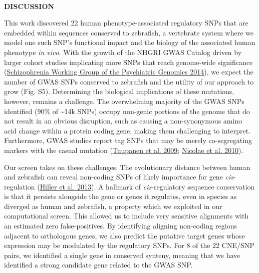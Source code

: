 \documentclass[]{article}
\begin{document}
\textbf{\\
}

\textbf{DISCUSSION}

This work discovered 22 human phenotype-associated regulatory SNPs that
are embedded within sequences conserved to zebrafish, a vertebrate
system where we model one such SNP's functional impact and the biology
of the associated human phenotype \emph{in vivo}. With the growth of the
NHGRI GWAS Catalog driven by larger cohort studies implicating more SNPs
that reach genome-wide significance
(\protect\hyperlink{_ENREF_26}{Schizophrenia Working Group of the
Psychiatric Genomics 2014}), we expect the number of GWAS SNPs conserved
to zebrafish and the utility of our approach to grow (Fig. S5).
Determining the biological implications of these mutations, however,
remains a challenge. The overwhelming majority of the GWAS SNPs
identified (90\% of \textasciitilde{}14k SNPs) occupy non-genic portions
of the genome that do not result in an obvious disruption, such as
causing a non-synonymous amino acid change within a protein coding gene,
making them challenging to interpret. Furthermore, GWAS studies report
tag SNPs that may be merely co-segregating markers with the casual
mutation (\protect\hyperlink{_ENREF_32}{Tuupanen et al. 2009};
\protect\hyperlink{_ENREF_22}{Nicolae et al. 2010}).

Our screen takes on these challenges. The evolutionary distance between
human and zebrafish can reveal non-coding SNPs of likely importance for
gene \emph{cis}-regulation (\protect\hyperlink{_ENREF_7}{Hiller et al.
2013}). A hallmark of \emph{cis}-regulatory sequence conservation is
that it persists alongside the gene or genes it regulates, even in
species as diverged as human and zebrafish, a property which we
exploited in our computational screen. This allowed us to include very
sensitive alignments with an estimated zero false-positives. By
identifying aligning non-coding regions adjacent to orthologous genes,
we also predict the putative target genes whose expression may be
modulated by the regulatory SNPs. For 8 of the 22 CNE/SNP pairs, we
identified a single gene in conserved synteny, meaning that we have
identified a strong candidate gene related to the GWAS SNP.
\end{document}
